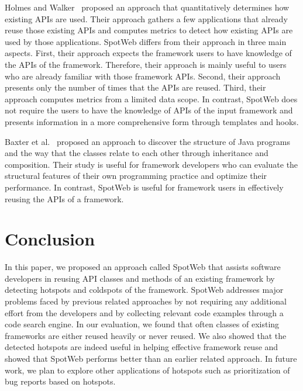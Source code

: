 \documentclass[conference]{IEEEtran}
\newcommand{\Comment}[1]{}
\begin{document}
Holmes and Walker~\cite{holmes:apiusage} proposed an approach 
that quantitatively determines how existing APIs are used. Their approach
gathers a few applications that already reuse those existing APIs
and computes metrics to detect how existing APIs are used by those applications.
SpotWeb differs from their approach in three main aspects. First, their approach 
expects the framework users to have knowledge 
of the APIs of the framework. Therefore, their approach is mainly useful to users who are already
familiar with those framework APIs. Second, their approach presents only the
number of times that the APIs are reused. Third, their approach computes metrics
from a limited data scope. In contrast, SpotWeb does not require the users
to have the knowledge of APIs of the input framework and presents information
in a more comprehensive form through templates and hooks.

Baxter et al.~\cite{baxter:shape} proposed an approach to discover
the structure of Java programs and the way that the classes relate
to each other through inheritance and composition. Their study is
useful for framework developers who can evaluate the structural
features of their own programming practice and optimize their
performance. In contrast, SpotWeb is useful for framework users
in effectively reusing the APIs of a framework.

\section {Conclusion}
\label {sec:conclusion}

In this paper, we proposed an approach called SpotWeb that 
assists software developers in reusing API classes and methods of an existing framework
by detecting hotspots and coldspots of the framework. \Comment{Hotspots can serve
as starting points for reusing the framework, whereas coldspots serve as caveats as there can 
be difficulties in finding related code examples.}
SpotWeb addresses major problems faced by previous 
related approaches by not requiring any additional effort
from the developers and by collecting relevant code examples through
a code search engine. In our evaluation, we found that often classes
of existing frameworks are either reused heavily or never reused.
We also showed that the detected hotspots are 
indeed useful in helping effective framework reuse 
and showed that SpotWeb performs better than an earlier related
approach. In future work, we plan to explore other applications
of hotspots such as prioritization of bug reports based on hotspots.
\end{document}
